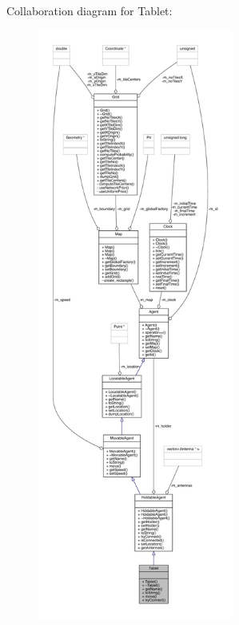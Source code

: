Collaboration diagram for Tablet\+:
\nopagebreak
\begin{figure}[H]
\begin{center}
\leavevmode
\includegraphics[height=550pt]{class_tablet__coll__graph}
\end{center}
\end{figure}
